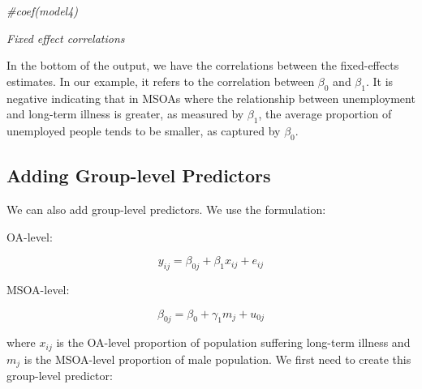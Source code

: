 \documentclass[
]{book}
\newenvironment{Shaded}{\begin{snugshade}}{\end{snugshade}}
\newcommand{\CommentTok}[1]{\textcolor[rgb]{0.56,0.35,0.01}{\textit{#1}}}
\begin{document}
\begin{Shaded}
\begin{Highlighting}[]
\CommentTok{#coef(model4)}
\end{Highlighting}
\end{Shaded}

\emph{Fixed effect correlations}

In the bottom of the output, we have the correlations between the fixed-effects estimates. In our example, it refers to the correlation between \(\beta_{0}\) and \(\beta_{1}\). It is negative indicating that in MSOAs where the relationship between unemployment and long-term illness is greater, as measured by \(\beta_{1}\), the average proportion of unemployed people tends to be smaller, as captured by \(\beta_{0}\).

\hypertarget{adding-group-level-predictors}{%
\subsection{Adding Group-level Predictors}\label{adding-group-level-predictors}}

We can also add group-level predictors. We use the formulation:

OA-level:

\[y_{ij} = \beta_{0j} + \beta_{1}x_{ij} + e_{ij}\]

MSOA-level:

\[\beta_{0j} = \beta_{0} + \gamma_{1}m_{j} + u_{0j}\]

where \(x_{ij}\) is the OA-level proportion of population suffering long-term illness and \(m_{j}\) is the MSOA-level proportion of male population. We first need to create this group-level predictor:
\end{document}
